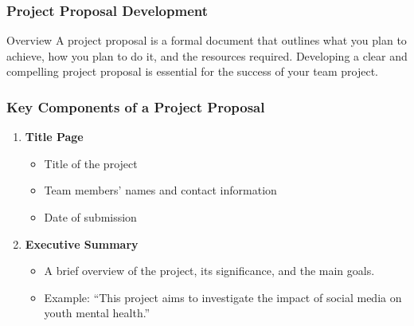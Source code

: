 \documentclass[aspectratio=169]{beamer}
\begin{document}
\begin{frame}[fragile]
    \frametitle{Project Proposal Development}
    \begin{block}{Overview}
        A project proposal is a formal document that outlines what you plan to achieve, how you plan to do it, and the resources required. Developing a clear and compelling project proposal is essential for the success of your team project.
    \end{block}
\end{frame}

\begin{frame}[fragile]
    \frametitle{Key Components of a Project Proposal}
    \begin{enumerate}
        \item \textbf{Title Page}
            \begin{itemize}
                \item Title of the project
                \item Team members’ names and contact information
                \item Date of submission
            \end{itemize}
        \item \textbf{Executive Summary}
            \begin{itemize}
                \item A brief overview of the project, its significance, and the main goals.
                \item Example: “This project aims to investigate the impact of social media on youth mental health.”
            \end{itemize}
    \end{enumerate}
\end{frame}
\end{document}
